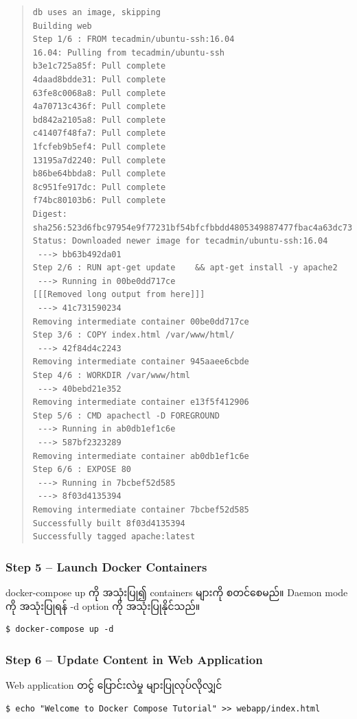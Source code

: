 \begin{quote}
\begin{verbatim}
db uses an image, skipping
Building web
Step 1/6 : FROM tecadmin/ubuntu-ssh:16.04
16.04: Pulling from tecadmin/ubuntu-ssh
b3e1c725a85f: Pull complete
4daad8bdde31: Pull complete
63fe8c0068a8: Pull complete
4a70713c436f: Pull complete
bd842a2105a8: Pull complete
c41407f48fa7: Pull complete
1fcfeb9b5ef4: Pull complete
13195a7d2240: Pull complete
b86be64bbda8: Pull complete
8c951fe917dc: Pull complete
f74bc80103b6: Pull complete
Digest: sha256:523d6fbc97954e9f77231bf54bfcfbbdd4805349887477fbac4a63dc735d777d
Status: Downloaded newer image for tecadmin/ubuntu-ssh:16.04
 ---> bb63b492da01
Step 2/6 : RUN apt-get update    && apt-get install -y apache2
 ---> Running in 00be0dd717ce
[[[Removed long output from here]]]
 ---> 41c731590234
Removing intermediate container 00be0dd717ce
Step 3/6 : COPY index.html /var/www/html/
 ---> 42f84d4c2243
Removing intermediate container 945aaee6cbde
Step 4/6 : WORKDIR /var/www/html
 ---> 40bebd21e352
Removing intermediate container e13f5f412906
Step 5/6 : CMD apachectl -D FOREGROUND
 ---> Running in ab0db1ef1c6e
 ---> 587bf2323289
Removing intermediate container ab0db1ef1c6e
Step 6/6 : EXPOSE 80
 ---> Running in 7bcbef52d585
 ---> 8f03d4135394
Removing intermediate container 7bcbef52d585
Successfully built 8f03d4135394
Successfully tagged apache:latest
\end{verbatim}
\end{quote}

\subsubsection{Step 5 -- Launch Docker
Containers}\label{step-5-launch-docker-containers}

docker-compose up ကို အသုံးပြု၍ containers များကို စတင်စေမည်။ Daemon
mode ကို အသုံးပြုရန် -d option ကို အသုံးပြုနိုင်သည်။

\begin{verbatim}
$ docker-compose up -d
\end{verbatim}

\subsubsection{Step 6 -- Update Content in Web Application
}\label{step-6-update-content-in-web-application}

Web application တင်ွ ပြောင်းလဲမှု များပြုလုပ်လိုလျှင်

\begin{verbatim}
$ echo "Welcome to Docker Compose Tutorial" >> webapp/index.html
\end{verbatim}

